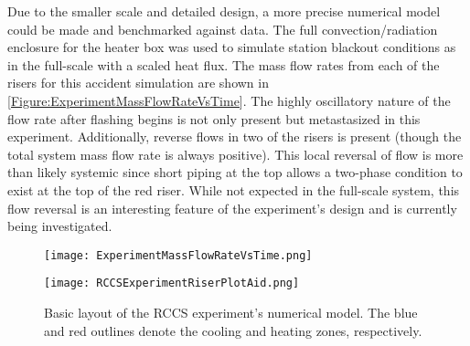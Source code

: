 Due to the smaller scale and detailed design, a more precise numerical model could be made and benchmarked against data.
The full convection/radiation enclosure for the heater box was used to simulate station blackout conditions as in the full-scale with a scaled heat flux.
The mass flow rates from each of the risers for this accident simulation are shown in \cref{Figure:ExperimentMassFlowRateVsTime}.
The highly oscillatory nature of the flow rate after flashing begins is not only present but metastasized in this experiment.
Additionally, reverse flows in two of the risers is present (though the total system mass flow rate is always positive).
This local reversal of flow is more than likely systemic since short piping at the top allows a two-phase condition to exist at the top of the red riser.
While not expected in the full-scale system, this flow reversal is an interesting feature of the experiment's design and is currently being investigated.

\begin{figure}%
    \centering
    \caption[ Mass flow rate versus time for the three riser tubes]{   
        Mass flow rate versus time for the three riser tubes of the RCCS experiment with station blackout accident conditions. 
        The colors of the plot lines correspond to the riser colors in \cref{Figure:RCCSExperimentRiserPlotAid}.}%
    \label{Figure:ExperimentMassFlowRateVsTime}%
    \texttt{[image: ExperimentMassFlowRateVsTime.png]}\\[2em]%
    \caption[Basic layout of the RCCS experiment]{Basic layout of the RCCS experiment's numerical model.
             The blue and red outlines denote the cooling and heating zones, respectively.}%
    \label{Figure:RCCSExperimentRiserPlotAid}%
    \texttt{[image: RCCSExperimentRiserPlotAid.png]}%
\end{figure}
